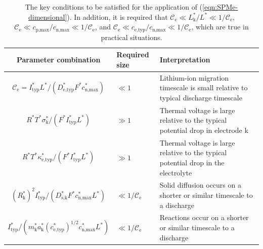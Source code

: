 \documentclass[a4paper]{article}
\newcommand{\ts}[1]{_{\text{#1}}}
\begin{document}
\begin{table}[h]
	\centering 
	\begin{tabular}{c l p{5cm}} 
  \toprule
  Parameter combination & Required size & Interpretation\\
  \midrule
  $\mathcal{C}\ts{e} = I\ts{typ}^* L^*/(D\ts{e,typ}^*F^*c\ts{n,max}^*)$  & $\ll 1$ &Lithium-ion migration timescale is small relative to typical discharge timescale \\
  $R^* T^* \sigma\ts{k}^* / (F^* I\ts{typ}^* L^*)$  & $\gg 1$ & Thermal voltage is large relative to the typical potential drop in electrode k\\
  $R^* T^* \kappa\ts{e,typ}^*/(F^* I\ts{typ}^* L^*)$ & $\gg 1$ & Thermal voltage is large relative to the typical potential drop in the electrolyte \\
  $(R\ts{k}^*)^2 I\ts{typ}^*/(D\ts{s,k}^* F^* c\ts{n,max}^* L^*)$ & $\ll 1/\mathcal{C}\ts{e}$ & Solid diffusion occurs on a shorter or similar timescale to a discharge  \\
  $I\ts{typ}^*/(m\ts{k}^* a\ts{k}^* (c\ts{e,typ}^*)^{1/2} c\ts{n,max}^* L^*)$ 
  & $\ll 1/\mathcal{C}\ts{e}$ & Reactions occur on a shorter or similar timescale to a discharge \\
  \bottomrule
  \end{tabular}
  \caption{The key conditions to be satisfied for the application of (\ref{eqn:SPMe-dimensional}). In addition, it is required that $\mathcal{C}\ts{e} \ll L\ts{k}^*/L^* \ll 1/\mathcal{C}\ts{e}$, $\mathcal{C}\ts{e}\ll c\ts{p,max}/c\ts{n,max}\ll 1/\mathcal{C}\ts{e}$, and $\mathcal{C}\ts{e} \ll c\ts{e,typ}/c\ts{n,max}\ll 1/\mathcal{C}\ts{e}$, which are true in practical situations.}
  \label{tab:conditions}
\end{table}

\clearpage
\end{document}
